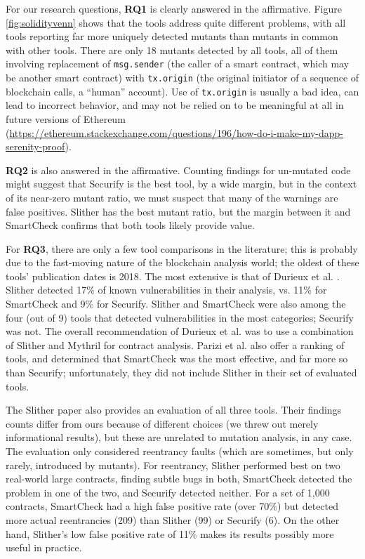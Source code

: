 For our research questions, {\bf RQ1} is clearly answered in the affirmative.  Figure \ref{fig:solidityvenn} shows that the tools address quite different problems, with all tools reporting far more uniquely detected mutants than mutants in common with other tools.  There are only 18 mutants detected by all tools, all of them involving replacement of {\tt msg.sender} (the caller of a smart contract, which may be another smart contract) with {\tt tx.origin} (the original initiator of a sequence of blockchain calls, a ``human'' account).  Use of {\tt tx.origin} is usually a bad idea, can lead to incorrect behavior, and may not be relied on to be meaningful at all in future versions of Ethereum (\url{https://ethereum.stackexchange.com/questions/196/how-do-i-make-my-dapp-serenity-proof}).  

{\bf RQ2} is also answered in the affirmative.  Counting findings for un-mutated code might suggest that Securify is the best tool, by a wide margin, but in the context of its near-zero mutant ratio, we must suspect that many of the warnings are false positives.  Slither has the best mutant ratio, but the margin between it and SmartCheck confirms that both tools likely provide value.

For {\bf RQ3}, there are only a few tool comparisons in the literature; this is probably due to the fast-moving nature of the blockchain analysis world; the oldest of these tools' publication dates is 2018.  The most extensive is that of Durieux et al. \cite{durieux2019empirical}.  Slither detected 17\% of known vulnerabilities in their analysis, vs. 11\% for SmartCheck and 9\% for Securify. Slither and SmartCheck were also among the four (out of 9) tools that detected vulnerabilities in the most categories; Securify was not.  The overall recommendation of Durieux et al. was to use a combination of Slither and Mythril \cite{mythril-code} for contract analysis.  Parizi et al. \cite{Parizi} also offer a ranking of tools, and determined that SmartCheck was the most effective, and far more so than Securify; unfortunately, they did not include Slither in their set of evaluated tools.

The Slither paper \cite{slither} also provides an evaluation of all three tools.  Their findings counts differ from ours because of different choices (we threw out merely informational results), but these are unrelated to mutation analysis, in any case.  The evaluation only considered reentrancy faults \cite{SurveyAttacks,FC20} (which are sometimes, but only rarely, introduced by mutants).  For reentrancy, Slither performed best on two real-world large contracts, finding subtle bugs in both, SmartCheck detected the problem in one of the two, and Securify detected neither.  For a set of 1,000 contracts, SmartCheck had a high false positive rate (over 70\%) but detected more actual reentrancies (209) than Slither (99) or Securify (6).  On the other hand, Slither's low false positive rate of 11\%  makes its results possibly more useful in practice.

